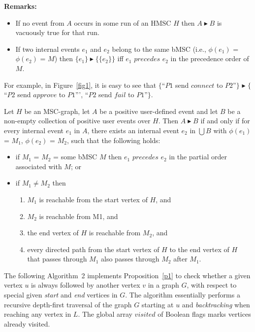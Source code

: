 \documentclass{entcs}
\begin{document}
{\bf {Remarks:}}
\begin{itemize}
\item If no event from $A$ occurs in some run of an 
HMSC $H$ then $A \blacktriangleright B$ is vacuously 
true for that run.
\item If two internal events $e_1$ and $e_2$ belong 
to the same bMSC (i.e., $\phi(e_1)$ = $\phi(e_2)$ = $M$) 
then $\{e_1\} \blacktriangleright \{\{e_2\}\}$ iff 
$e_1$ $precedes$ $e_2$ in the precedence order of $M$.
\end{itemize}

For example, in Figure~\ref{fig1}, it is easy to see that 
$\{$``$P1$ send $connect$ to $P2$''$\}$ $\blacktriangleright$ 
$\{$``$P2$ send $approve$ to $P1$''', 
``$P2$ send $fail$ to $P1$''$\}$.

\begin{proposition}
\label{p1}
Let $H$ be an MSC-graph, let $A$ be a positive 
user-defined event and let $B$ be a non-empty collection 
of positive user events over $H$. Then $A \blacktriangleright B$ 
if and only if for every internal event $e_1$ in $A$, 
there exists an internal event $e_2$ in $\bigcup B$ with 
$\phi(e_1)$ = $M_1$, $\phi(e_2)$ = $M_2$, such that the 
following holds:
\begin{itemize}
\item if $M_1$ = $M_2$ = some bMSC $M$ then $e_1$ $precedes$ $e_2$ 
in the partial order associated with $M$; or
\item if $M_1 \neq M_2$ then
\begin{enumerate}
\item $M_1$ is reachable from the start vertex of $H$, and
\item $M_2$ is reachable from M1, and
\item the end vertex of $H$ is reachable from $M_2$, and
\item every directed path from the start vertex of $H$ 
to the end vertex of $H$ that passes through $M_1$ also 
passes through $M_2$ after $M_1$.
\end{enumerate}
\end{itemize}
\end{proposition}

The following Algorithm~2
implements Proposition~\ref{p1} to check whether a
given vertex $u$ is always followed by another vertex $v$
in a graph $G$, with respect to special
given {\em start} and {\em end} vertices in $G$. The algorithm 
essentially performs a recursive depth-first traversal of 
the graph $G$ starting at $u$ and {\em backtracking} when 
reaching any vertex in $L$. The global array $visited$ of 
Boolean flags marks vertices already visited. 
\end{document}
